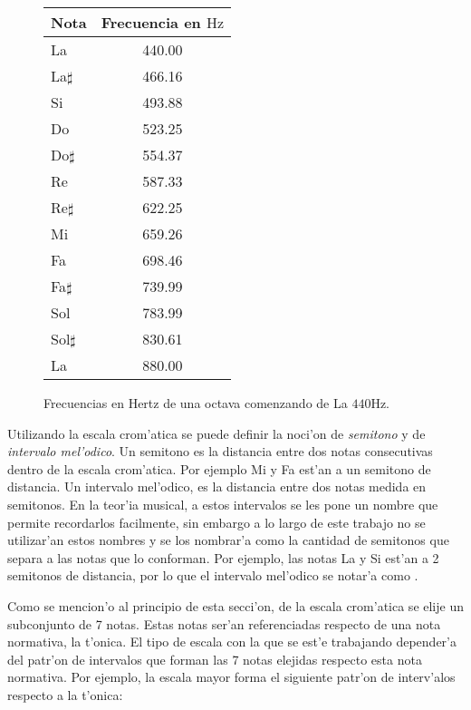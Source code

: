 \begin{figure}
\begin{center}
    \begin{tabular}[c]{|l|c|}
    \hline
    \textbf{Nota} & \textbf{Frecuencia en $\mbox{Hz}$} \\
    \hline 
    La		        &	440.00 \\
    La$\sharp$		&	466.16 \\
    Si	        	&	493.88 \\
    Do	        	&	523.25 \\
    Do$\sharp$      &	554.37 \\
    Re	        	&	587.33 \\
    Re$\sharp$      &	622.25 \\
    Mi	        	&	659.26 \\
    Fa	        	&	698.46 \\
    Fa$\sharp$      &	739.99 \\
    Sol	        	&	783.99 \\
    Sol$\sharp$     &	830.61 \\
    La	        	&	880.00 \\ 
    \hline
    \end{tabular}
 \caption{Frecuencias en Hertz de una octava comenzando de La $440\mbox{Hz}$.}
 \label{tab:cromatica}
\end{center}
\end{figure}


Utilizando la escala crom'atica se puede definir la noci'on de \emph{semitono} y de \emph{intervalo mel'odico}. Un semitono es la distancia
entre dos notas consecutivas dentro de la escala crom'atica. Por ejemplo Mi y Fa est'an a un semitono de distancia. Un intervalo mel'odico, 
es la distancia entre dos notas medida en semitonos. En la teor'ia musical, a estos intervalos se les pone un nombre que permite recordarlos 
facilmente, sin embargo a lo largo de este trabajo no se utilizar'an estos nombres y se los nombrar'a como la cantidad de semitonos que separa
a las notas que lo conforman. Por ejemplo, las notas La y Si est'an a 2 semitonos de distancia, por lo que el intervalo mel'odico
se notar'a como . 

Como se mencion'o al principio de esta secci'on, de la escala crom'atica se elije un subconjunto de 7 notas. Estas notas ser'an referenciadas
respecto de una nota normativa, la t'onica. El tipo de escala con la que se est'e trabajando depender'a del patr'on de intervalos que 
forman las 7 notas elejidas respecto esta nota normativa. Por ejemplo, la escala mayor forma el siguiente patr'on de interv'alos respecto a la t'onica:

